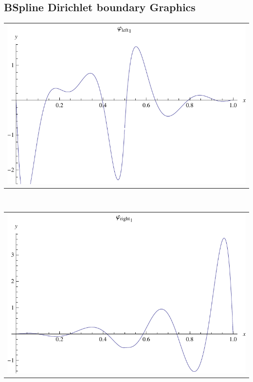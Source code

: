 \documentclass{article}
\begin{document}
\begin{landscape}
\subsection{BSpline Dirichlet boundary Graphics}
\begin{tabular}{c}
\includegraphics[width=20.cm]{sextic_bspline_dleft_1.pdf}\end{tabular} 
 \\ 
\begin{tabular}{c}
\includegraphics[width=20.cm]{sextic_bspline_dright_1.pdf}\end{tabular} 
 \end{landscape}
\end{document}
